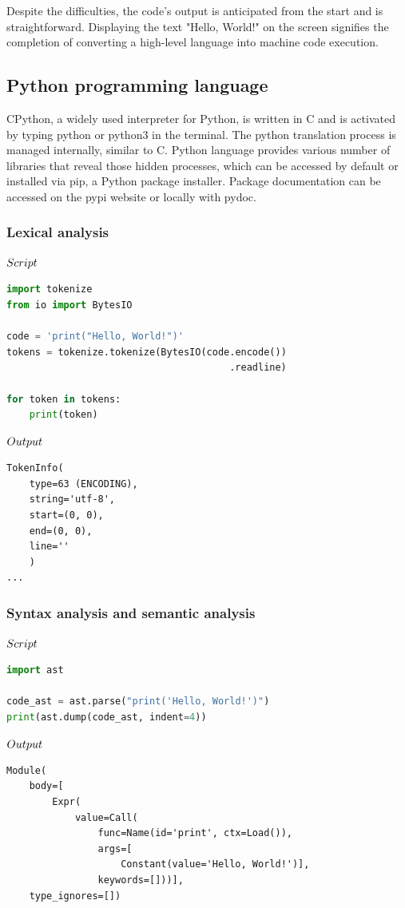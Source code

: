 \documentclass[journal]{IEEEtran}
\begin{document}
Despite the difficulties, the code's output is anticipated from the start and is straightforward. Displaying the text "Hello, World!" on the screen signifies the completion of converting a high-level language into machine code execution.

\subsection{Python programming language}
CPython, a widely used interpreter for Python, is written in C and is activated by typing python or python3 in the terminal. The python translation process is managed internally, similar to C. Python language provides various number of libraries that reveal those hidden processes, which can be accessed by default or installed via pip, a Python package installer. Package documentation can be accessed on the pypi website or locally with pydoc.

\subsubsection{Lexical analysis}
$\\{Script}$

\begin{lstlisting}[language=Python, breaklines=true, basicstyle=\footnotesize, frame=single]
import tokenize
from io import BytesIO

code = 'print("Hello, World!")'
tokens = tokenize.tokenize(BytesIO(code.encode())
                                       .readline)

for token in tokens:
    print(token)
\end{lstlisting}

$\\{Output}$

\begin{lstlisting}[breaklines=true, basicstyle=\footnotesize, frame=single]
TokenInfo(
    type=63 (ENCODING), 
    string='utf-8', 
    start=(0, 0), 
    end=(0, 0), 
    line=''
    )
...
\end{lstlisting}


\subsubsection{Syntax analysis and semantic analysis}
$\\{Script}$

\begin{lstlisting}[language=Python, breaklines=true, basicstyle=\footnotesize, frame=single]
import ast

code_ast = ast.parse("print('Hello, World!')")
print(ast.dump(code_ast, indent=4))
\end{lstlisting}
$\\{Output}$
\begin{lstlisting}[breaklines=true, basicstyle=\footnotesize, frame=single]
Module(
    body=[
        Expr(
            value=Call(
                func=Name(id='print', ctx=Load()),
                args=[
                    Constant(value='Hello, World!')],
                keywords=[]))],
    type_ignores=[])
\end{lstlisting}
\end{document}
